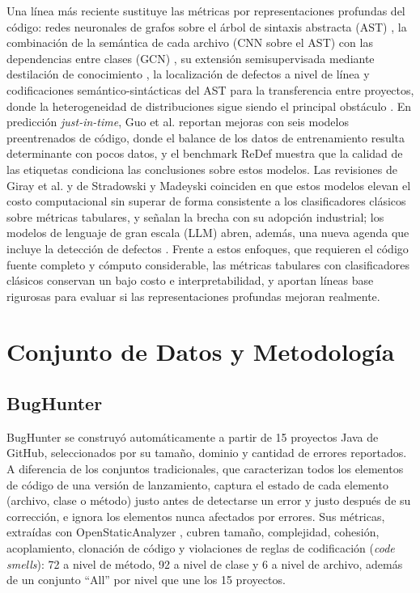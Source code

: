 \documentclass[conference,a4paper]{IEEEtran}
\begin{document}
Una línea más reciente sustituye las métricas por representaciones profundas del código: redes neuronales de grafos sobre el árbol de sintaxis abstracta (AST) \cite{sikic2022}, la combinación de la semántica de cada archivo (CNN sobre el AST) con las dependencias entre clases (GCN) \cite{zhou2022}, su extensión semisupervisada mediante destilación de conocimiento \cite{liu2024sedpgk}, la localización de defectos a nivel de línea \cite{pornprasit2023} y codificaciones semántico-sintácticas del AST para la transferencia entre proyectos, donde la heterogeneidad de distribuciones sigue siendo el principal obstáculo \cite{jiang2024}. En predicción \textit{just-in-time}, Guo et al. \cite{guo2023} reportan mejoras con seis modelos preentrenados de código, donde el balance de los datos de entrenamiento resulta determinante con pocos datos, y el benchmark ReDef \cite{nam2026} muestra que la calidad de las etiquetas condiciona las conclusiones sobre estos modelos. Las revisiones de Giray et al. \cite{giray2023} y de Stradowski y Madeyski \cite{stradowski2023} coinciden en que estos modelos elevan el costo computacional sin superar de forma consistente a los clasificadores clásicos sobre métricas tabulares, y señalan la brecha con su adopción industrial; los modelos de lenguaje de gran escala (LLM) abren, además, una nueva agenda \cite{hou2024,fan2023} que incluye la detección de defectos \cite{chen2026llm}. Frente a estos enfoques, que requieren el código fuente completo y cómputo considerable, las métricas tabulares con clasificadores clásicos conservan un bajo costo e interpretabilidad, y aportan líneas base rigurosas para evaluar si las representaciones profundas mejoran realmente.

\section{Conjunto de Datos y Metodología}
\label{sec:metodologia}

\subsection{BugHunter}

BugHunter \cite{ferenc2020} se construyó automáticamente a partir de 15 proyectos Java de GitHub, seleccionados por su tamaño, dominio y cantidad de errores reportados. A diferencia de los conjuntos tradicionales, que caracterizan todos los elementos de código de una versión de lanzamiento, captura el estado de cada elemento (archivo, clase o método) justo antes de detectarse un error y justo después de su corrección, e ignora los elementos nunca afectados por errores. Sus métricas, extraídas con OpenStaticAnalyzer \cite{osa2004}, cubren tamaño, complejidad, cohesión, acoplamiento, clonación de código y violaciones de reglas de codificación (\textit{code smells}): 72 a nivel de método, 92 a nivel de clase y 6 a nivel de archivo, además de un conjunto ``All'' por nivel que une los 15 proyectos.
\end{document}
